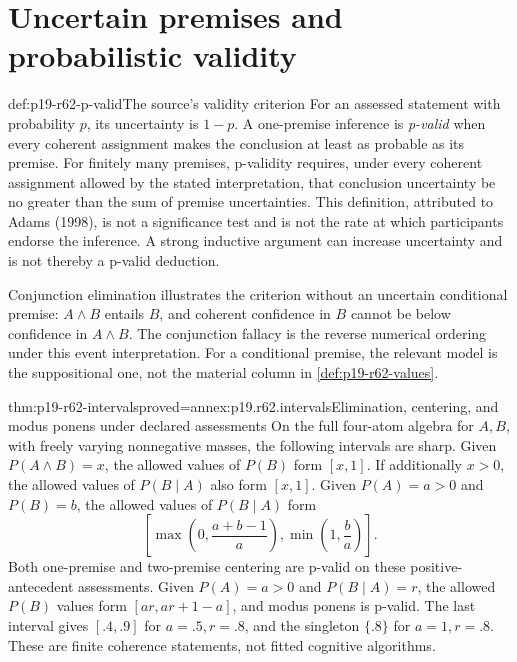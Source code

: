 \section{Uncertain premises and probabilistic validity}
\label{sec:p19-r62-coherence}

\begin{hbdefinition}{def:p19-r62-p-valid}{The source's validity criterion}
For an assessed statement with probability \(p\), its uncertainty is
\(1-p\). A one-premise inference is \emph{p-valid} when every coherent
assignment makes the conclusion at least as probable as its premise.
For finitely many premises, p-validity requires, under every coherent
assignment allowed by the stated interpretation, that conclusion
uncertainty be no greater than the sum of premise uncertainties.
This definition, attributed to Adams (1998), is not a significance
test and is not the rate at which participants endorse the inference.
A strong inductive argument can increase uncertainty and is not thereby
a p-valid deduction.
\end{hbdefinition}

Conjunction elimination illustrates the criterion without an uncertain
conditional premise: \(A\land B\) entails \(B\), and coherent
confidence in \(B\) cannot be below confidence in \(A\land B\).
The conjunction fallacy is the reverse numerical ordering under this
event interpretation. For a conditional premise, the relevant model is
the suppositional one, not the material column in
\cref{def:p19-r62-values}.

\begin{hbtheorem}{thm:p19-r62-intervals}{proved=annex:p19.r62.intervals}{Elimination, centering, and modus ponens under declared assessments}
On the full four-atom algebra for \(A,B\), with freely varying
nonnegative masses, the following intervals are sharp.
Given \(P(A\land B)=x\), the allowed values of \(P(B)\) form
\([x,1]\). If additionally \(x>0\), the allowed values of
\(P(B\mid A)\) also form \([x,1]\).
Given \(P(A)=a>0\) and \(P(B)=b\), the allowed values of
\(P(B\mid A)\) form
\[
 \left[\max\left(0,\frac{a+b-1}{a}\right),
       \min\left(1,\frac ba\right)\right].
\]
Both one-premise and two-premise centering are p-valid on these
positive-antecedent assessments. Given \(P(A)=a>0\) and
\(P(B\mid A)=r\), the allowed \(P(B)\) values form
\([ar,ar+1-a]\), and modus ponens is p-valid.
The last interval gives \([.4,.9]\) for \(a=.5,r=.8\), and
the singleton \(\{.8\}\) for \(a=1,r=.8\).
These are finite coherence statements, not fitted cognitive algorithms.
\end{hbtheorem}

